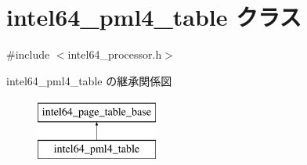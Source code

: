\hypertarget{classintel64__pml4__table}{}\section{intel64\+\_\+pml4\+\_\+table クラス}
\label{classintel64__pml4__table}


{\ttfamily \#include $<$intel64\+\_\+processor.\+h$>$}

intel64\+\_\+pml4\+\_\+table の継承関係図\begin{figure}[H]
\begin{center}
\leavevmode
\includegraphics[height=2.000000cm]{classintel64__pml4__table}
\end{center}
\end{figure}
